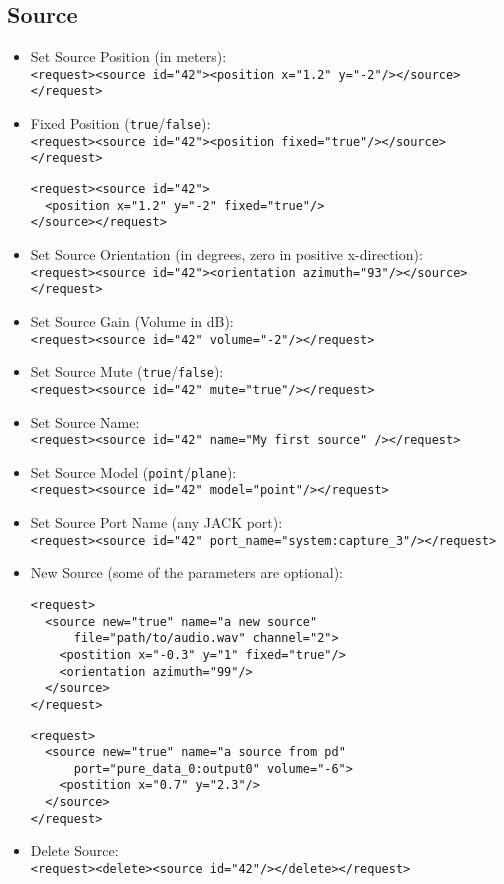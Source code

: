 \subsection{Source}

\begin{itemize}
  \item Set Source Position (in meters):\\
    \verb|<request><source id="42"><position x="1.2" y="-2"/></source></request>|

  \item Fixed Position (\verb|true|/\verb|false|):\\
    \verb|<request><source id="42"><position fixed="true"/></source></request>|
    \begin{verbatim}
<request><source id="42">
  <position x="1.2" y="-2" fixed="true"/>
</source></request>
    \end{verbatim}

  \item Set Source Orientation (in degrees, zero in positive x-direction):\\
    \verb|<request><source id="42"><orientation azimuth="93"/></source></request>|

  \item Set Source Gain (Volume in dB):\\
    \verb|<request><source id="42" volume="-2"/></request>|

  \item Set Source Mute (\verb|true|/\verb|false|):\\
    \verb|<request><source id="42" mute="true"/></request>|

  \item Set Source Name:\\
    \verb|<request><source id="42" name="My first source" /></request>|

  \item Set Source Model (\verb|point|/\verb|plane|):\\
    \verb|<request><source id="42" model="point"/></request>|

  \item Set Source Port Name (any JACK port):\\
    \verb|<request><source id="42" port_name="system:capture_3"/></request>|

  \item New Source (some of the parameters are optional):
    \begin{verbatim}
<request>
  <source new="true" name="a new source"
      file="path/to/audio.wav" channel="2">
    <postition x="-0.3" y="1" fixed="true"/>
    <orientation azimuth="99"/>
  </source>
</request>
    \end{verbatim}
    \begin{verbatim}
<request>
  <source new="true" name="a source from pd"
      port="pure_data_0:output0" volume="-6">
    <postition x="0.7" y="2.3"/>
  </source>
</request>
    \end{verbatim}
  \item Delete Source:\\
    \verb|<request><delete><source id="42"/></delete></request>|
\end{itemize}

